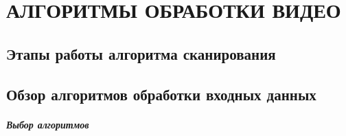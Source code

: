 \chapter{АЛГОРИТМЫ ОБРАБОТКИ ВИДЕО}
    \section{Этапы работы алгоритма сканирования}
    
    \section{Обзор алгоритмов обработки входных данных}
        \paragraph{Выбор алгоритмов}